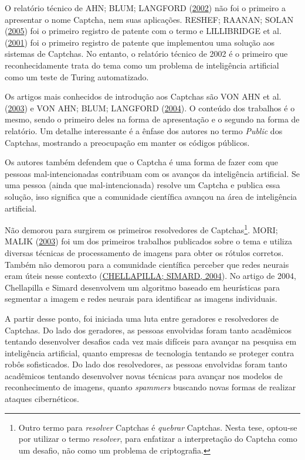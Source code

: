 \documentclass[12pt,twoside,brazilian]{book}
\begin{document}
O relatório técnico de AHN; BLUM; LANGFORD
(\protect\hyperlink{ref-vonahnTellingHumansComputers2002}{2002}) não foi
o primeiro a apresentar o nome Captcha, nem suas aplicações. RESHEF;
RAANAN; SOLAN
(\protect\hyperlink{ref-reshefMethodSystemDiscriminating2005}{2005}) foi
o primeiro registro de patente com o termo e LILLIBRIDGE et al.
(\protect\hyperlink{ref-lillibridgeMethodSelectivelyRestricting2001}{2001})
foi o primeiro registro de patente que implementou uma solução aos
sistemas de Captchas. No entanto, o relatório técnico de 2002 é o
primeiro que reconhecidamente trata do tema como um problema de
inteligência artificial como um teste de Turing automatizado.

Os artigos mais conhecidos de introdução aos Captchas são VON AHN et al.
(\protect\hyperlink{ref-vonahnCaptchaTellingHumans2003}{2003}) e VON
AHN; BLUM; LANGFORD
(\protect\hyperlink{ref-vonahnTellingHumansComputers2004}{2004}). O
conteúdo dos trabalhos é o mesmo, sendo o primeiro deles na forma de
apresentação e o segundo na forma de relatório. Um detalhe interessante
é a ênfase dos autores no termo \emph{Public} dos Captchas, mostrando a
preocupação em manter os códigos públicos.

Os autores também defendem que o Captcha é uma forma de fazer com que
pessoas mal-intencionadas contribuam com os avanços da inteligência
artificial. Se uma pessoa (ainda que mal-intencionada) resolve um
Captcha e publica essa solução, isso significa que a comunidade
científica avançou na área de inteligência artificial.

Não demorou para surgirem os primeiros resolvedores de
Captchas\footnote{Outro termo para \emph{resolver} Captchas é
  \emph{quebrar} Captchas. Nesta tese, optou-se por utilizar o termo
  \emph{resolver}, para enfatizar a interpretação do Captcha como um
  desafio, não como um problema de criptografia.}. MORI; MALIK
(\protect\hyperlink{ref-mori2003a}{2003}) foi um dos primeiros trabalhos
publicados sobre o tema e utiliza diversas técnicas de processamento de
imagens para obter os rótulos corretos. Também não demorou para a
comunidade científica perceber que redes neurais eram úteis nesse
contexto (\protect\hyperlink{ref-chellapilla2004}{CHELLAPILLA; SIMARD,
2004}). No artigo de 2004, Chellapilla e Simard desenvolvem um algoritmo
baseado em heurísticas para segmentar a imagem e redes neurais para
identificar as imagens individuais.

A partir desse ponto, foi iniciada uma luta entre geradores e
resolvedores de Captchas. Do lado dos geradores, as pessoas envolvidas
foram tanto acadêmicos tentando desenvolver desafios cada vez mais
difíceis para avançar na pesquisa em inteligência artificial, quanto
empresas de tecnologia tentando se proteger contra robôs sofisticados.
Do lado dos resolvedores, as pessoas envolvidas foram tanto acadêmicos
tentando desenvolver novas técnicas para avançar nos modelos de
reconhecimento de imagens, quanto \emph{spammers} buscando novas formas
de realizar ataques cibernéticos.
\end{document}
